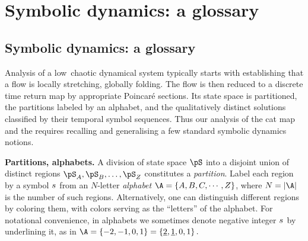 
\ifblog
\chapter{Symbolic dynamics: a glossary}
\label{s-SymbDynGloss}
\else %
\section{Symbolic dynamics: a glossary}
\label{s-SymbDynGloss}
\fi
\renewcommand{\statesp}{state space}
\renewcommand{\Statesp}{State space}
\renewcommand{\stateDsp}{state-space}
\renewcommand{\StateDsp}{State-space}

Analysis of a low\dmn\ chaotic dynamical system typically
starts with establishing that a flow is locally stretching, globally
folding. The flow is then reduced to a discrete time return map by appropriate
Poincar\'e sections. Its state space is partitioned, the partitions labeled by an
alphabet, and the qualitatively distinct solutions classified by their temporal
symbol sequences. Thus our analysis of the cat map and the {\catlatt} requires
recalling and generalising a few standard symbolic dynamics notions.

{\bf Partitions, alphabets.}
A division of {\statesp} $\pS$ into a disjoint union of distinct regions
$\pS_A,\pS_B,\ldots,\pS_Z$ constitutes a {\em
partition}. Label each region by a symbol ${s_{}}$ from an
$N$-letter  {\em alphabet}
$\A=\{A,B,C,\cdots,Z\}$, where $N=\cl{\A}$ is
the number of such regions. Alternatively, one can distinguish different
regions by coloring them, with colors serving as the ``letters'' of the
alphabet.
For notational convenience, in alphabets we sometimes denote negative integer
${s_{}}$ by underlining it, as in
\(
\A = \{ -{2}, -{1}, 0, 1\}
   = \{ \underline{2}, \underline{1}, 0, 1\}
\,.
\)


